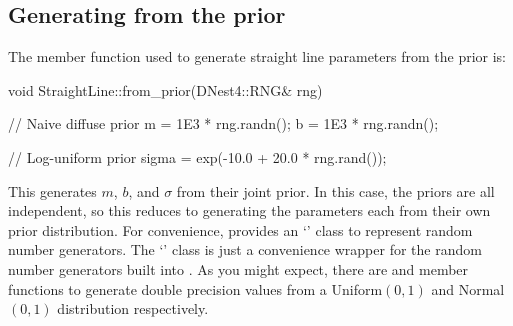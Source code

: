 \documentclass[article]{jss}
\begin{document}
\subsection{Generating from the prior}
The member function used to generate straight line parameters from the
prior is:
%
\begin{CodeChunk}
\begin{CodeInput}
void StraightLine::from_prior(DNest4::RNG& rng)
{
   // Naive diffuse prior
   m = 1E3 * rng.randn();
   b = 1E3 * rng.randn();

   // Log-uniform prior
   sigma = exp(-10.0 + 20.0 * rng.rand());
}
\end{CodeInput}
\end{CodeChunk}
%
This generates $m$, $b$, and $\sigma$ from their joint prior. In this case,
the priors are all independent, so this reduces to generating the parameters
each from their own prior distribution. For convenience,
 provides an `' class to represent random number
generators. The `' class is just a convenience wrapper for the
random number generators built into .
As you might expect, there are
 and  member functions to generate
double precision values
from a Uniform$(0,1)$ and Normal$(0,1)$ distribution respectively.
\end{document}
